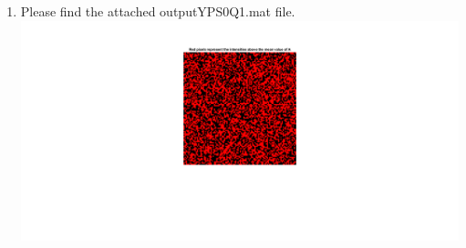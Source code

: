 \documentclass[man]{apa6}
\begin{document}
\begin{enumerate}
\begin{enumerate}
				\item Please find the attached outputYPS0Q1.mat file.
					\includegraphics[width=\linewidth]{plots/1-A-4/e.png}
				
			\end{enumerate}
		
	\end{enumerate}
\end{document}
